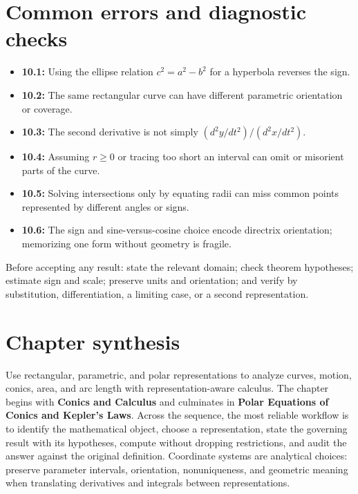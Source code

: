 \documentclass[11pt]{article}
\begin{document}
\section{Common errors and diagnostic checks}
\begin{warningbox}
\begin{itemize}
\item \textbf{10.1:} Using the ellipse relation $c^2=a^2-b^2$ for a hyperbola reverses the sign.
\item \textbf{10.2:} The same rectangular curve can have different parametric orientation or coverage.
\item \textbf{10.3:} The second derivative is not simply $(d^2y/dt^2)/(d^2x/dt^2)$.
\item \textbf{10.4:} Assuming $r\ge0$ or tracing too short an interval can omit or misorient parts of the curve.
\item \textbf{10.5:} Solving intersections only by equating radii can miss common points represented by different angles or signs.
\item \textbf{10.6:} The sign and sine-versus-cosine choice encode directrix orientation; memorizing one form without geometry is fragile.
\end{itemize}
\end{warningbox}
\begin{checkbox}
Before accepting any result: state the relevant domain; check theorem hypotheses; estimate sign and scale; preserve units and orientation; and verify by substitution, differentiation, a limiting case, or a second representation.
\end{checkbox}

\section{Chapter synthesis}
Use rectangular, parametric, and polar representations to analyze curves, motion, conics, area, and arc length with representation-aware calculus. The chapter begins with \textbf{Conics and Calculus} and culminates in \textbf{Polar Equations of Conics and Kepler's Laws}. Across the sequence, the most reliable workflow is to identify the mathematical object, choose a representation, state the governing result with its hypotheses, compute without dropping restrictions, and audit the answer against the original definition. Coordinate systems are analytical choices: preserve parameter intervals, orientation, nonuniqueness, and geometric meaning when translating derivatives and integrals between representations.
\end{document}
